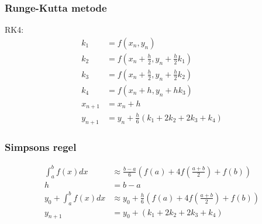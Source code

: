 \begin{frame}
\frametitle{Runge-Kutta metode}
RK4:\\
\begin{align*}
k_1&=f(x_n,y_n)\\
k_2&=f(x_n+\frac{h}{2},y_n+\frac{h}{2}k_1)\\
k_3&=f(x_n+\frac{h}{2},y_n+\frac{h}{2}k_2)\\
k_4&=f(x_n+h,y_n+h k_3)\\
x_{n+1}&=x_n+h\\
y_{n+1}&=y_n+\frac{h}{6}(k_1+2k_2+2k_3+k_4)
\end{align*}
\end{frame}

\begin{frame}
\frametitle{Simpsons regel}
\begin{align*}
\int_a^bf(x)dx &\approx \frac{b-a}{6} \left( f(a)+4f \left( \frac{a+b}{2} \right)+f(b) \right)\\
h&=b-a\\
y_0+\int_a^bf(x)dx &\approx y_0+ \frac{h}{6} \left( f(a)+4f \left( \frac{a+b}{2} \right)+f(b) \right)\\
y_{n+1}&=y_0+(k_1+2k_2+2k_3+k_4)
\end{align*}
\end{frame}

